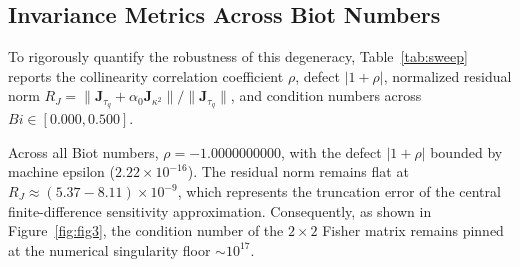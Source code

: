 \documentclass[review,12pt]{article}
\begin{document}
\subsection{Invariance Metrics Across Biot Numbers}

To rigorously quantify the robustness of this degeneracy, Table~\ref{tab:sweep} reports the collinearity correlation coefficient $\rho$, defect $|1+\rho|$, normalized residual norm $R_J = \|\bm{J}_{\tau_q} + \alpha_0 \bm{J}_{\kappa^2}\| / \|\bm{J}_{\tau_q}\|$, and condition numbers across $Bi \in [0.000, 0.500]$.

Across all Biot numbers, $\rho = -1.0000000000$, with the defect $|1+\rho|$ bounded by machine epsilon ($2.22 \times 10^{-16}$). The residual norm remains flat at $R_J \approx (5.37 - 8.11) \times 10^{-9}$, which represents the truncation error of the central finite-difference sensitivity approximation. Consequently, as shown in Figure~\ref{fig:fig3}, the condition number of the $2 \times 2$ Fisher matrix remains pinned at the numerical singularity floor $\sim 10^{17}$.

\begin{table}[htbp]
\centering
\caption{Systematic parameter sweep across Biot numbers at Fourier resonance ($B = 1.0$): Collinearity metrics, singular spectrum, and condition numbers.}
\label{tab:sweep}
\end{table}
\end{document}
